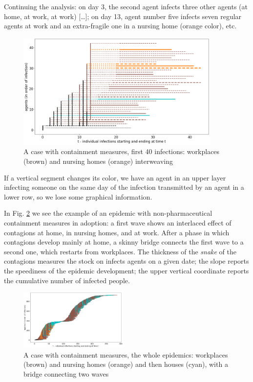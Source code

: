 \documentclass[graybox]{svmult}
\begin{document}
Continuing the analysis: on day 3, the second agent infects three other agents (at home, at work, at work) [\dots]; on day 13, agent number five infects seven regular agents at work and an extra-fragile one in a nursing home (orange color), etc.

\begin{figure}[t]
\center
\includegraphics[width=0.9\textwidth]{with8b40.png}%
\caption{A case with containment measures, first 40 infections: workplaces (brown) and nursing homes (orange) interweaving}
\label{shortExample}
\end{figure}

If a vertical segment changes its color, we have an agent in an upper layer infecting someone on the same day of the infection transmitted by an agent in a lower row, so we lose some graphical information.

In Fig. \ref{workplacesNursingHomesFull} we see the example of an epidemic with non-pharmaceutical containment measures in adoption: a first wave shows an interlaced effect of contagions at home, in nursing homes, and at work. After a phase in which contagions develop mainly at home, a skinny bridge connects the first wave to a second one, which restarts from workplaces. The thickness of the \emph{snake} of the contagions measures the stock on infects agents on a given date; the slope reports the speediness of the epidemic development; the upper vertical coordinate reports the cumulative number of infected people.

\begin{figure}[t]
\center
\includegraphics[width=0.48\textwidth]{with8a.png}%
\caption{A case with containment measures, the whole epidemics: workplaces (brown) and nursing homes (orange) and then houses (cyan), with a bridge connecting two waves}
\label{workplacesNursingHomesFull}
\end{figure}
\end{document}
